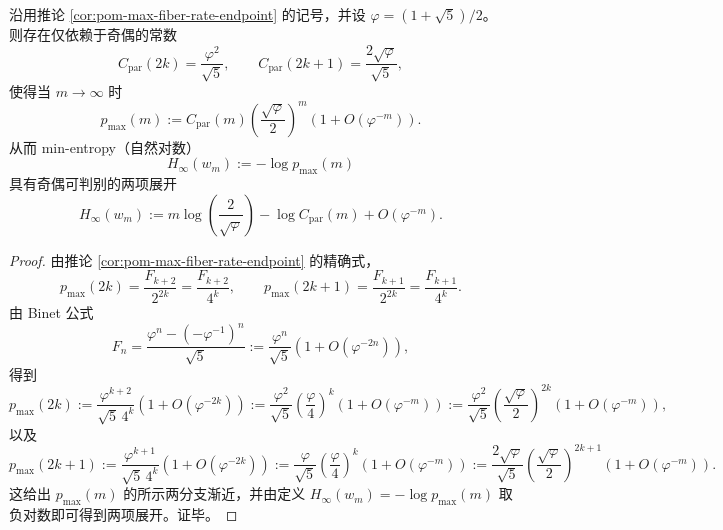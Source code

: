 \begin{proposition}\label{prop:pom-max-atomic-weight-parity-second-order}
沿用推论 \ref{cor:pom-max-fiber-rate-endpoint} 的记号，并设 \(\varphi=(1+\sqrt5)/2\)。
则存在仅依赖于奇偶的常数
\[
C_{\mathrm{par}}(2k)=\frac{\varphi^2}{\sqrt5},\qquad
C_{\mathrm{par}}(2k+1)=\frac{2\sqrt{\varphi}}{\sqrt5},
\]
使得当 \(m\to\infty\) 时
\[
p_{\max}(m)
:=C_{\mathrm{par}}(m)\left(\frac{\sqrt{\varphi}}{2}\right)^m\left(1+O(\varphi^{-m})\right).
\]
从而 min-entropy（自然对数）
\[
H_\infty(w_m):=-\log p_{\max}(m)
\]
具有奇偶可判别的两项展开
\[
H_\infty(w_m)
:=m\log\!\left(\frac{2}{\sqrt{\varphi}}\right)-\log C_{\mathrm{par}}(m)+O(\varphi^{-m}).
\]
\end{proposition}
\begin{proof}
由推论 \ref{cor:pom-max-fiber-rate-endpoint} 的精确式，
\[
p_{\max}(2k)=\frac{F_{k+2}}{2^{2k}}=\frac{F_{k+2}}{4^k},
\qquad
p_{\max}(2k+1)=\frac{F_{k+1}}{2^{2k}}=\frac{F_{k+1}}{4^k}.
\]
由 Binet 公式
\[
F_n=\frac{\varphi^n-(-\varphi^{-1})^n}{\sqrt5}
:=\frac{\varphi^n}{\sqrt5}\left(1+O(\varphi^{-2n})\right),
\]
得到
\[
p_{\max}(2k)
:=\frac{\varphi^{k+2}}{\sqrt5\,4^k}\left(1+O(\varphi^{-2k})\right)
:=\frac{\varphi^2}{\sqrt5}\left(\frac{\varphi}{4}\right)^k\left(1+O(\varphi^{-m})\right)
:=\frac{\varphi^2}{\sqrt5}\left(\frac{\sqrt\varphi}{2}\right)^{2k}\left(1+O(\varphi^{-m})\right),
\]
以及
\[
p_{\max}(2k+1)
:=\frac{\varphi^{k+1}}{\sqrt5\,4^k}\left(1+O(\varphi^{-2k})\right)
:=\frac{\varphi}{\sqrt5}\left(\frac{\varphi}{4}\right)^k\left(1+O(\varphi^{-m})\right)
:=\frac{2\sqrt{\varphi}}{\sqrt5}\left(\frac{\sqrt\varphi}{2}\right)^{2k+1}\left(1+O(\varphi^{-m})\right).
\]
这给出 \(p_{\max}(m)\) 的所示两分支渐近，并由定义 \(H_\infty(w_m)=-\log p_{\max}(m)\) 取负对数即可得到两项展开。证毕。
\end{proof}

\endinput
